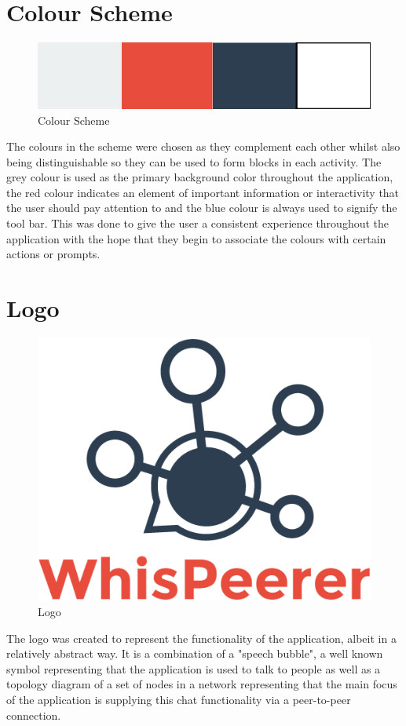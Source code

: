 \documentclass[]{report}
\begin{document}
		\section{Colour Scheme}
		\begin{figure}[H]
			\caption{Colour Scheme}
			\centering
			\includegraphics[scale=0.35]{ColourScheme.png}
		\end{figure}
		The colours in the scheme were chosen as they complement each other whilst also being distinguishable so they can be used to form blocks in each activity. The grey colour is used as the primary background color throughout the application, the red colour indicates an element of important information or interactivity that the user should pay attention to and the blue colour is always used to signify the tool bar. This was done to give the user a consistent experience throughout the application with the hope that they begin to associate the colours with certain actions or prompts.
		
		\section{Logo}
		\begin{figure}[H]
			\caption{Logo}
			\centering
			\includegraphics[scale=0.35]{logo.png}
		\end{figure}
		The logo was created to represent the functionality of the application, albeit in a relatively abstract way. It is a combination of a "speech bubble", a well known symbol representing that the application is used to talk to people as well as a topology diagram of a set of nodes in a network representing that the main focus of the application is supplying this chat functionality via a peer-to-peer connection.
		
\end{document}
